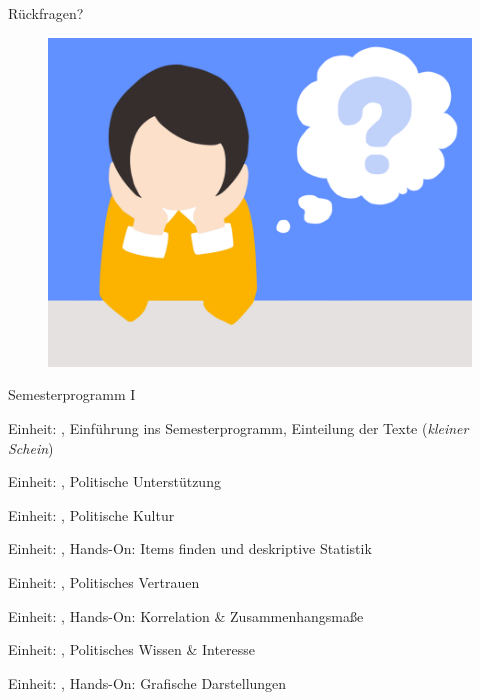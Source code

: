 \documentclass[11pt]{beamer}
\begin{document}
\begin{frame}[t]{Rückfragen?}
	\begin{center}
		\begin{figure}[ht]
			\includegraphics[width=\textwidth]{pics/pre8.png}
		\end{figure}	
	\end{center}
\end{frame}

\begin{frame}[t]{Semesterprogramm I}
\begin{nolist}
		\item Einheit: , Einführung ins Semesterprogramm, Einteilung der Texte (\textit{kleiner Schein})
		\item Einheit: , Politische Unterstützung \pause
		\item Einheit: , Politische Kultur
		\item Einheit: , Hands-On: Items finden und deskriptive Statistik \pause
		\item Einheit: , Politisches Vertrauen
		\item Einheit: , Hands-On: Korrelation \& Zusammenhangsmaße \pause
		\item Einheit: , Politisches Wissen \& Interesse
		\item Einheit: , Hands-On: Grafische Darstellungen \pause
\end{nolist}
\end{frame}
\end{document}
